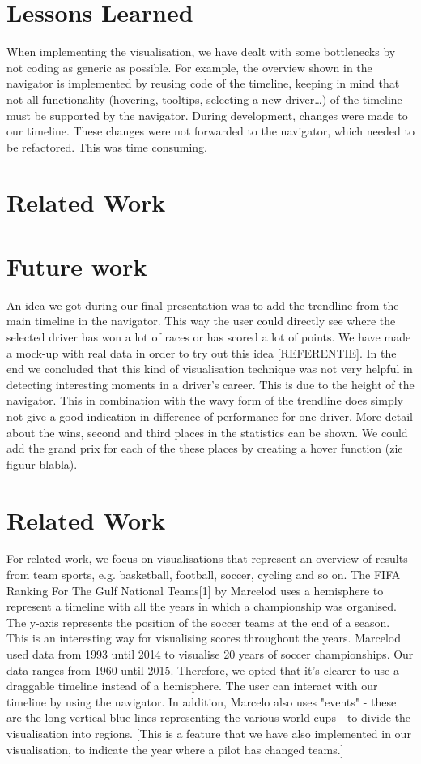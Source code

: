 \documentclass{sigchi}
\begin{document}
\section{Lessons Learned}
When implementing the visualisation, we have dealt with some bottlenecks by not coding as generic as possible. For example, the overview shown in the navigator is implemented by reusing code of the timeline, keeping in mind that not all functionality (hovering, tooltips, selecting a new driver…) of the timeline must be supported by the navigator. During development, changes were made to our timeline. These changes were not forwarded to the navigator, which needed to be refactored. This was time consuming.
\section{Related Work} %
\label{sec:related_work}

\section{Future work} %
\label{sec:future_work}
An idea we got during our final presentation was to add the trendline from the main timeline in the navigator. This way the user could directly see where the selected driver has won a lot of races or has scored a lot of points. We have made a mock-up with real data in order to try out this idea [REFERENTIE]. In the end we concluded that this kind of visualisation technique was not very helpful in detecting interesting moments in a driver’s career. This is due to the height of the navigator. This in combination with the wavy form of the trendline does simply not give a good indication in difference of performance for one driver.
More detail about the wins, second and third places in the statistics can be shown. We could add the grand prix for each of the these places by creating a hover function (zie figuur blabla).
\section{Related Work}
For related work, we focus on visualisations that represent an overview of results from team sports, e.g. basketball, football, soccer, cycling and so on.  
The FIFA Ranking For The Gulf National Teams[1] by Marcelod uses a hemisphere to represent a timeline with all the years in which a championship was organised. The y-axis represents the position of the soccer teams at the end of a season. This is an interesting way for visualising scores throughout the years. Marcelod used data from 1993 until 2014 to visualise 20 years of soccer championships. Our data ranges from 1960 until 2015. Therefore, we opted that it’s clearer to use a draggable timeline instead of a hemisphere. The user can interact with our timeline by using the navigator. In addition, Marcelo also uses "events" - these are the long vertical blue lines representing the various world cups - to divide the visualisation into regions. [This is a feature that we have also implemented in our visualisation, to indicate the year where a pilot has changed teams.] 
 
\end{document}
